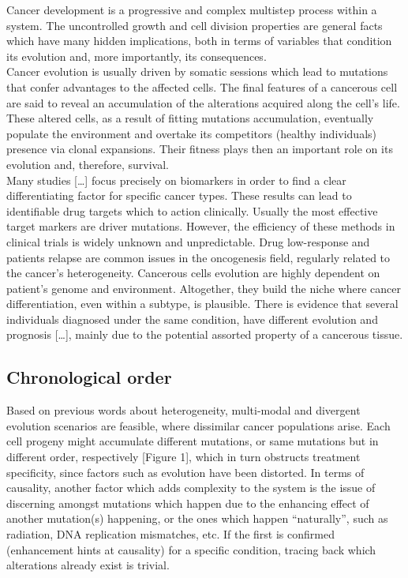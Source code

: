Cancer development is a progressive and complex multistep process within a system. The uncontrolled growth and cell division properties are general facts which have many hidden implications, both in terms of variables that condition its evolution and, more importantly, its consequences.
\\

Cancer evolution is usually driven by somatic sessions which lead to mutations that confer advantages to the affected cells. The final features of a cancerous cell are said to reveal an accumulation of the alterations acquired along the cell’s life.
\\

These altered cells, as a result of fitting mutations accumulation, eventually populate the environment and overtake its competitors (healthy individuals) presence via clonal expansions. Their fitness plays then an important role on its evolution and, therefore, survival.
\\

Many studies […] focus precisely on biomarkers in order to find a clear differentiating factor for specific cancer types. These results can lead to identifiable drug targets which to action clinically. Usually the most effective target markers are driver mutations. However, the efficiency of these methods in clinical trials is widely unknown and unpredictable. Drug low-response and patients relapse are common issues in the oncogenesis field, regularly related to the cancer’s heterogeneity. Cancerous cells evolution are highly dependent on patient’s genome and environment. Altogether, they build the niche where cancer differentiation, even within a subtype, is plausible. There is evidence that several individuals diagnosed under the same condition, have different evolution and prognosis […], mainly due to the potential assorted property of a cancerous tissue.
\\

\subsection{Chronological order}
Based on previous words about heterogeneity, multi-modal and divergent evolution scenarios are feasible, where dissimilar cancer populations arise. Each cell progeny might accumulate different mutations, or same mutations but in different order, respectively [Figure 1], which in turn obstructs treatment specificity, since factors such as evolution have been distorted.
In terms of causality, another factor which adds complexity to the system is the issue of discerning amongst mutations which happen due to the enhancing effect of another mutation(s) happening, or the ones which happen “naturally”, such as radiation, DNA replication mismatches, etc. If the first is confirmed (enhancement hints at causality) for a specific condition, tracing back which alterations already exist is trivial.
\\

